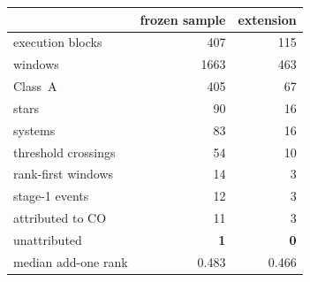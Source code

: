 \begin{tabular}{@{}lrr@{}}
\toprule
 & frozen sample & extension \\
\midrule
execution blocks & 407 & 115 \\
windows & 1663 & 463 \\
\quad Class~A & 405 & 67 \\
stars & 90 & 16 \\
systems & 83 & 16 \\
\midrule
threshold crossings & 54 & 10 \\
rank-first windows & 14 & 3 \\
stage-1 events & 12 & 3 \\
\quad attributed to CO & 11 & 3 \\
\quad unattributed & \textbf{1} & \textbf{0} \\
\midrule
median add-one rank & 0.483 & 0.466 \\
\bottomrule
\end{tabular}
